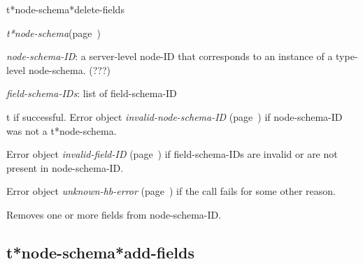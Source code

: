 \begin{description}
\item [Name:]  t*node-schema*delete-fields

\item [Class:] {\sl t*node-schema}\hfill(page~\pageref{t*node-schema})

\item [Parameters:]
\item {\sl node-schema-ID}:  a server-level node-ID that corresponds to an 
instance of a type-level node-schema. (???)


\item {\sl field-schema-IDs}:  list of field-schema-ID
 

\item [Return-value:]
t if successful.
Error object {\sl invalid-node-schema-ID} (page~\pageref{invalid-node-schema-ID}) if
node-schema-ID was not a t*node-schema.

Error object {\sl invalid-field-ID} (page~\pageref{invalid-field-ID}) if field-schema-IDs 
are invalid or are not present in node-schema-ID.

Error object {\sl unknown-hb-error} (page~\pageref{unknown-hb-error}) if the call fails
for some other reason.

\item [Description:]

Removes one or more fields from node-schema-ID. 

\item [Public:]



\end{description}
\horizontalline

\subsection{t*node-schema*add-fields}
\label{t*node-schema*add-fields}

